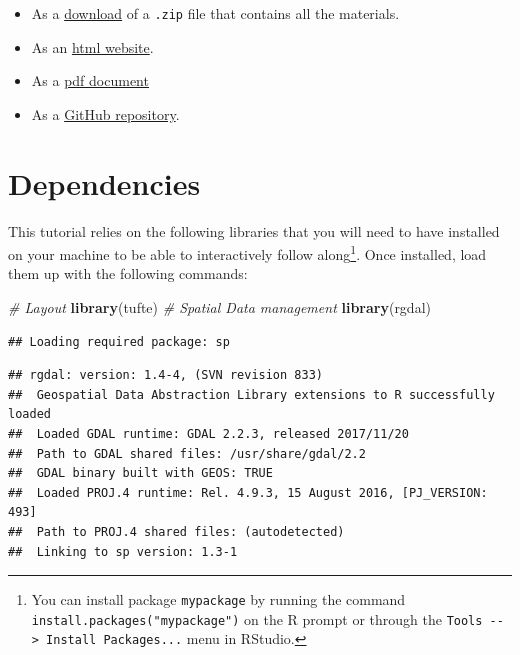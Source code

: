 \documentclass[]{book}
\newenvironment{Shaded}{\begin{snugshade}}{\end{snugshade}}
\newcommand{\CommentTok}[1]{\textcolor[rgb]{0.56,0.35,0.01}{\textit{#1}}}
\newcommand{\KeywordTok}[1]{\textcolor[rgb]{0.13,0.29,0.53}{\textbf{#1}}}
\newcommand{\NormalTok}[1]{#1}
\providecommand{\tightlist}{%
  \setlength{\itemsep}{0pt}\setlength{\parskip}{0pt}}
\let\rmarkdownfootnote\footnote%
\def\footnote{\protect\rmarkdownfootnote}
\begin{document}
\begin{itemize}
\tightlist
\item
  As a \href{https://github.com/GDSL-UL/san/archive/master.zip}{download} of a \texttt{.zip} file that contains all the materials.
\item
  As an \href{https://gdsl-ul.github.io/san/flows.html}{html
  website}.
\item
  As a \href{https://gdsl-ul.github.io/san/spatial_analysis_notes.pdf}{pdf
  document}
\item
  As a \href{https://github.com/GDSL-UL/san}{GitHub repository}.
\end{itemize}

\hypertarget{dependencies-2}{%
\section{Dependencies}\label{dependencies-2}}

This tutorial relies on the following libraries that you will need to have installed on your machine to be able to interactively follow along\footnote{You can install package \texttt{mypackage} by running the command \texttt{install.packages("mypackage")} on the R prompt or through the \texttt{Tools\ -\/-\textgreater{}\ Install\ Packages...} menu in RStudio.}. Once installed, load them up with the following commands:

\begin{Shaded}
\begin{Highlighting}[]
\CommentTok{# Layout}
\KeywordTok{library}\NormalTok{(tufte)}
\CommentTok{# Spatial Data management}
\KeywordTok{library}\NormalTok{(rgdal)}
\end{Highlighting}
\end{Shaded}

\begin{verbatim}
## Loading required package: sp
\end{verbatim}

\begin{verbatim}
## rgdal: version: 1.4-4, (SVN revision 833)
##  Geospatial Data Abstraction Library extensions to R successfully loaded
##  Loaded GDAL runtime: GDAL 2.2.3, released 2017/11/20
##  Path to GDAL shared files: /usr/share/gdal/2.2
##  GDAL binary built with GEOS: TRUE 
##  Loaded PROJ.4 runtime: Rel. 4.9.3, 15 August 2016, [PJ_VERSION: 493]
##  Path to PROJ.4 shared files: (autodetected)
##  Linking to sp version: 1.3-1
\end{verbatim}
\end{document}
